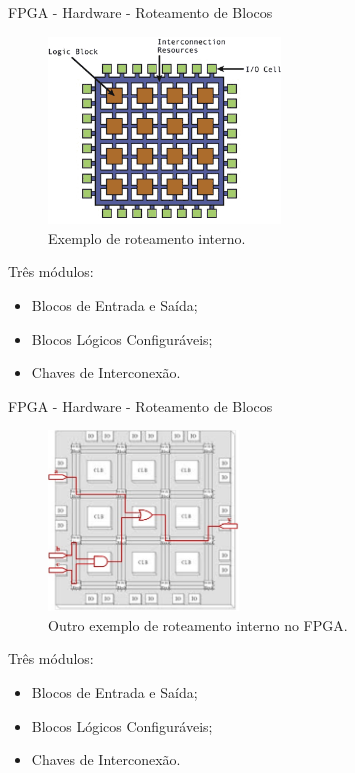 \documentclass[aspectratio=169]{beamer}
\begin{document}
	\begin{frame}{FPGA - Hardware - Roteamento de Blocos}
		\begin{multicols}{2}
			\begin{figure}[h]
				\centering
				\includegraphics[width=0.55\textwidth]{img/fpga/exempo-simples.png}
				\caption{Exemplo de roteamento interno.}
				\label{fig:exempo-simples}
			\end{figure}
			\columnbreak
			Três módulos:
			\begin{itemize}
				\setlength\itemsep{1.8em}
				\item Blocos de Entrada e Saída;
				
				\item Blocos Lógicos Configuráveis;
				
				\item Chaves de Interconexão.
			\end{itemize}
		\end{multicols}
	\end{frame}
	
	\begin{frame}{FPGA - Hardware - Roteamento de Blocos}
		\begin{multicols}{2}
			\begin{figure}[h]
				\centering
				\includegraphics[width=0.45\textwidth]{img/fpga/exemplo.jpg}
				\caption{Outro exemplo de roteamento interno no FPGA.}
				\label{fig:exemplo}
			\end{figure}
			\columnbreak
			Três módulos:
			\begin{itemize}
				\setlength\itemsep{1.8em}
				\item Blocos de Entrada e Saída;
				
				\item Blocos Lógicos Configuráveis;
				
				\item Chaves de Interconexão.
			\end{itemize}
		\end{multicols}
	\end{frame}
	
\end{document}
